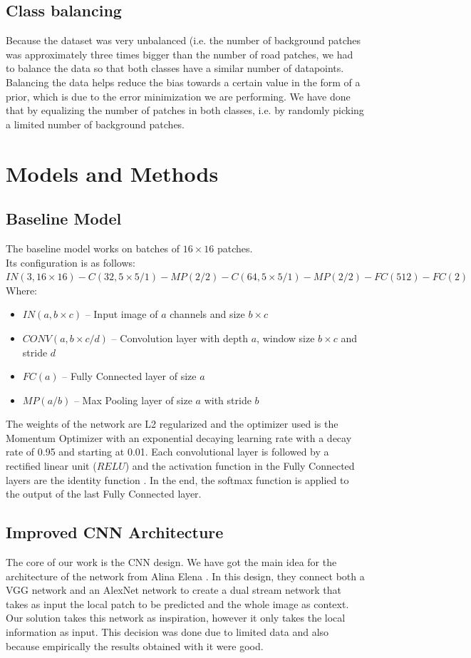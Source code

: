 \documentclass[10pt,conference,compsocconf]{IEEEtran}
\begin{document}
\subsection{Class balancing}
\label{sec:balance}
Because the dataset was very unbalanced (i.e. the number of background patches was approximately three times bigger than the number of road patches, we had to balance the data so that both classes have a similar number of datapoints. Balancing the data helps reduce the bias towards a certain value in the form of a prior, which is due to the error minimization we are performing. We have done that by 
equalizing the number of patches in both classes, i.e. by randomly picking a limited number of background patches.



\section{Models and Methods}
\label{sec:model_and_methods}
\subsection{Baseline Model}
The baseline model works on batches of $16 \times 16$ patches.\\
 Its configuration is as follows:
 $IN(3, 16\times16)
-C(32, 5\times5 /1) - MP(2 / 2) - C(64, 5\times5 /1) - MP(2 / 2)
-FC(512)-FC(2)$\\
Where:
\begin{itemize}
\item $IN(a,b\times c)$ -- Input image of $a$ channels and size $b \times  c$
\item $CONV(a,b\times c / d)$ -- Convolution layer with depth $a$, window size $b\times c$ and stride $d$
\item $FC(a)$ -- Fully Connected layer of size $a$
\item $MP(a / b)$ -- Max Pooling layer of size $a$ with stride $b$
\end{itemize}

The weights of the network are L2 regularized and the optimizer used is the Momentum Optimizer  with an exponential decaying learning rate with a decay rate of 0.95 and starting at 0.01.
Each convolutional layer is followed by a rectified linear unit ($RELU$) and the activation function in the Fully Connected layers are the identity function .
In the end, the softmax function is applied to the output of the last Fully Connected layer. 
\subsection{Improved CNN Architecture}
The core of our work is the CNN design. We have got the main idea for the architecture
of the network from Alina Elena \cite{mthesis}. In this design, they connect both a VGG network \cite{vgg} and an AlexNet network \cite{alexnet} to create a dual stream network that takes as input the local patch to be predicted and the whole image as context.
Our solution takes this network as inspiration, however it only takes the local information as input. This decision was done due to limited data and also because empirically the results obtained with it were good.
\end{document}
